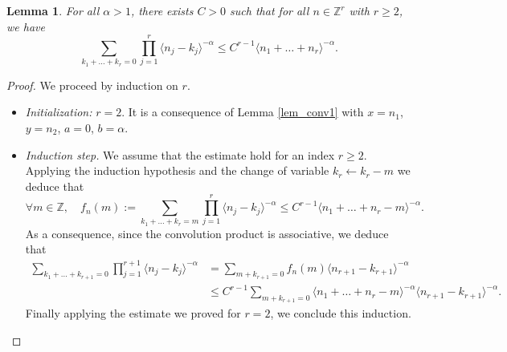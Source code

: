 \documentclass[JEP,XML,SOM,Unicode,NoEqCountersInSection,published]{cedram}
\newtheorem{lemma}[theorem]{Lemma}
\theoremstyle{definition}
\begin{document}
\begin{lemma}
\label{lemma_convol}
For all $\alpha>1$, there exists $C>0$ such that for all $n\in \mathbb{Z}^r$ with $r\geq 2$, we have
\[
\sum_{k_1+\dots+k_r = 0} \prod_{j=1}^r \langle n_j - k_j \rangle^{-\alpha} \leq C^{r-1} \langle n_1 + \dots + n_r \rangle^{-\alpha}.
\]
\end{lemma}
\begin{proof} We proceed by induction on $r$.
\begin{itemize}
\item
\emph{Initialization:} $r =2$. It is a consequence of Lemma \ref{lem_conv1} with $x= n_1$, $y=n_2$, $a=0$, $b=\alpha$.

\item
\emph{Induction step.} We assume that the estimate hold for an index $r\geq 2$. Applying the induction hypothesis and the change of variable $k_r \leftarrow k_r-m$ we deduce that
\[
\forall m \in \mathbb{Z}, \quad f_n(m):=\sum_{k_1+\dots+k_r = m} \prod_{j=1}^r \langle n_j - k_j \rangle^{-\alpha} \leq C^{r-1} \langle n_1 + \dots + n_r -m \rangle^{-\alpha}.
\]
As a consequence, since the convolution product is associative, we deduce that
\begin{equation*}
\begin{split}
\sum_{k_1+\dots+k_{r+1} = 0} \prod_{j=1}^{r+1} \langle n_j - k_j \rangle^{-\alpha} &= \sum_{m+k_{r+1} = 0} f_n(m) \langle n_{r+1} - k_{r+1} \rangle^{-\alpha} \\
&\leq C^{r-1} \! \! \sum_{m+k_{r+1} = 0} \! \! \langle n_1 + \dots + n_r -m \rangle^{-\alpha} \langle n_{r+1} - k_{r+1} \rangle^{-\alpha}.
\end{split}
\end{equation*}
Finally applying the estimate we proved for $r=2$, we conclude this induction.\qedhere
\end{itemize}
\end{proof}
\end{document}
